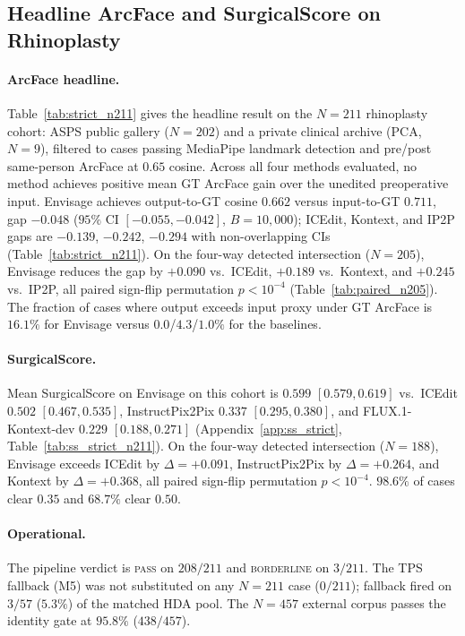 \documentclass{article}
\newcommand{\method}{Envisage}
\begin{document}
\subsection{Headline ArcFace and SurgicalScore on Rhinoplasty}

\paragraph{ArcFace headline.}
Table~\ref{tab:strict_n211} gives the headline result on the $N{=}211$
rhinoplasty cohort: ASPS public gallery ($N{=}202$) and a private clinical
archive (PCA, $N{=}9$), filtered to cases passing MediaPipe landmark
detection and pre/post same-person ArcFace at $0.65$ cosine. Across all
four methods evaluated, no method achieves positive mean GT ArcFace gain
over the unedited preoperative input. \method{} achieves output-to-GT
cosine $0.662$ versus input-to-GT $0.711$, gap $-0.048$ ($95\%$ CI
$[-0.055, -0.042]$, $B{=}10{,}000$); ICEdit, Kontext, and IP2P gaps are
$-0.139$, $-0.242$, $-0.294$ with non-overlapping CIs
(Table~\ref{tab:strict_n211}). On the four-way detected intersection
($N{=}205$), \method{} reduces the gap by $+0.090$ vs.\ ICEdit, $+0.189$
vs.\ Kontext, and $+0.245$ vs.\ IP2P, all paired sign-flip permutation
$p < 10^{-4}$ (Table~\ref{tab:paired_n205}). The fraction of cases where
output exceeds input proxy under GT ArcFace is $16.1\%$ for \method{}
versus $0.0$/$4.3$/$1.0\%$ for the baselines.

\paragraph{SurgicalScore.}
Mean SurgicalScore on \method{} on this cohort is $0.599$ $[0.579, 0.619]$
vs.\ ICEdit $0.502$ $[0.467, 0.535]$, InstructPix2Pix $0.337$
$[0.295, 0.380]$, and FLUX.1-Kontext-dev $0.229$ $[0.188, 0.271]$
(Appendix~\ref{app:ss_strict}, Table~\ref{tab:ss_strict_n211}). On the
four-way detected intersection ($N{=}188$), \method{} exceeds ICEdit by
$\Delta{=}+0.091$, InstructPix2Pix by $\Delta{=}+0.264$, and Kontext by
$\Delta{=}+0.368$, all paired sign-flip permutation $p < 10^{-4}$. $98.6\%$
of cases clear $0.35$ and $68.7\%$ clear $0.50$.

\paragraph{Operational.}
The pipeline verdict is \textsc{pass} on $208/211$ and \textsc{borderline}
on $3/211$. The TPS fallback (M5) was not substituted on any $N{=}211$
case ($0/211$); fallback fired on $3/57$ ($5.3\%$) of the matched HDA
pool. The $N{=}457$ external corpus passes the identity gate at $95.8\%$
($438/457$).
\end{document}
